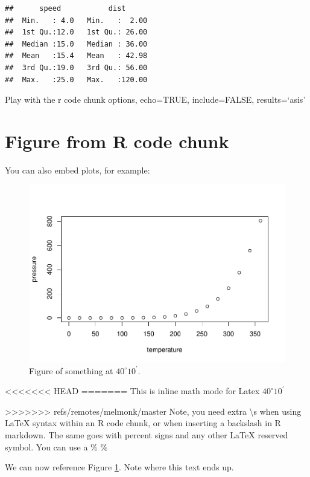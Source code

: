 \documentclass[12pt,]{article}
\begin{document}
\begin{itemize}
\begin{verbatim}
##      speed           dist       
##  Min.   : 4.0   Min.   :  2.00  
##  1st Qu.:12.0   1st Qu.: 26.00  
##  Median :15.0   Median : 36.00  
##  Mean   :15.4   Mean   : 42.98  
##  3rd Qu.:19.0   3rd Qu.: 56.00  
##  Max.   :25.0   Max.   :120.00
\end{verbatim}

Play with the r code chunk options, echo=TRUE, include=FALSE,
results=`asis'

\FloatBarrier

\section{Figure from R code chunk}\label{figure-from-r-code-chunk}

You can also embed plots, for example:

\begin{figure}[htbp]
\centering
\includegraphics{4-Workshop_examples_files/figure-latex/pressure-1.pdf}
\caption{Figure of something at \(40^\circ 10^\prime\).
\label{fig:pressure}}
\end{figure}

<<<<<<< HEAD
=======
This is inline math mode for Latex \(40^\circ 10^\prime\)

>>>>>>> refs/remotes/melmonk/master
Note, you need extra \textbackslash{}s when using LaTeX syntax within an
R code chunk, or when inserting a backslash in R markdown. The same goes
with percent signs and any other LaTeX reserved symbol. You can use a \%
\(\%\)

We can now reference Figure \ref{fig:pressure}. Note where this text
ends up.


\end{itemize}
\end{document}
